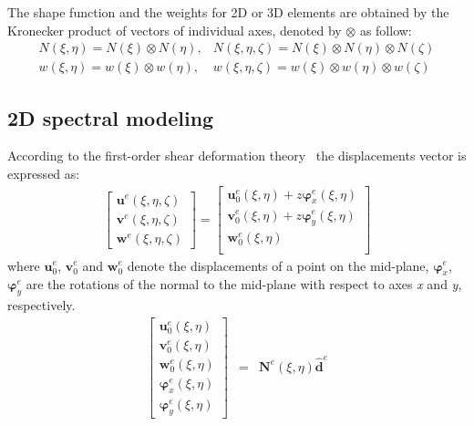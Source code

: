 \documentclass[a4paper,12pt]{article}
\begin{document}
{The shape function and the weights for 2D or 3D elements are obtained by the Kronecker product of vectors of individual axes, denoted by \(\otimes\) as follow:
\begin{eqnarray}
N(\xi,\eta) = N(\xi)\otimes N(\eta), & N(\xi,\eta,\zeta) = N(\xi)\otimes N(\eta)\otimes N(\zeta) \nonumber\\
w(\xi,\eta) = w(\xi)\otimes w(\eta), & w(\xi,\eta,\zeta) = w(\xi)\otimes w(\eta)\otimes w(\zeta) 
\label{eq:3Dshape_weights}
\end{eqnarray}
\subsection{2D spectral modeling}
\label{sec:2D_SEM}

According to the first-order shear deformation theory~\cite{reissner1945effect, mindlin1951influence} the displacements vector is expressed as:
\begin{eqnarray}
\left [ \begin{array}{c}
\textbf{u}^e(\xi,\eta,\zeta) \\
\textbf{v}^e(\xi,\eta,\zeta) \\
\textbf{w}^e(\xi,\eta,\zeta)
\end{array} \right] = 
\left [ \begin{array}{c}
\textbf{u}_0^e(\xi,\eta) + z\boldsymbol{\varphi}_x^e(\xi,\eta)\\
\textbf{v}_0^e(\xi,\eta) + z\boldsymbol{\varphi}_y^e(\xi,\eta)\\
\textbf{w}_0^e(\xi,\eta) \\
\end{array} \right]
\end{eqnarray}
where \(\textbf{u}_0^e\), \(\textbf{v}_0^e\) and \(\textbf{w}_0^e\) denote the 
displacements of a point on the mid-plane, \(\boldsymbol{\varphi}_x^e\), 
\(\boldsymbol{\varphi}_y^e\) are the rotations of the normal to the mid-plane 
with respect to axes \textit{x} and \textit{y}, respectively.
\begin{eqnarray}
\left [ \begin{array}{c}
\textbf{u}_0^e(\xi,\eta) \\
\textbf{v}_0^e(\xi,\eta) \\
\textbf{w}_0^e(\xi,\eta) \\
\boldsymbol{\varphi}_x^e(\xi,\eta) \\
\boldsymbol{\varphi}_y^e(\xi,\eta)
\end{array} \right]
& = & \textbf{N}^e(\xi,\eta)\widehat{\textbf{d}}^e\nonumber\\

\end{eqnarray}}
\end{document}

